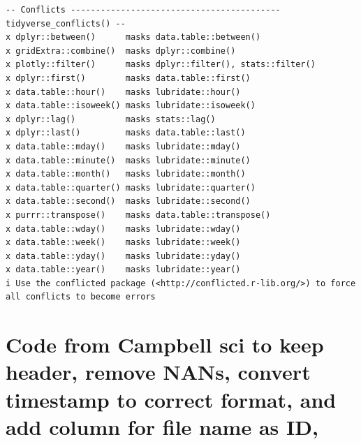\documentclass[
  letterpaper,
  DIV=11,
  numbers=noendperiod]{scrartcl}
\begin{document}
\begin{verbatim}
-- Conflicts ------------------------------------------ tidyverse_conflicts() --
x dplyr::between()      masks data.table::between()
x gridExtra::combine()  masks dplyr::combine()
x plotly::filter()      masks dplyr::filter(), stats::filter()
x dplyr::first()        masks data.table::first()
x data.table::hour()    masks lubridate::hour()
x data.table::isoweek() masks lubridate::isoweek()
x dplyr::lag()          masks stats::lag()
x dplyr::last()         masks data.table::last()
x data.table::mday()    masks lubridate::mday()
x data.table::minute()  masks lubridate::minute()
x data.table::month()   masks lubridate::month()
x data.table::quarter() masks lubridate::quarter()
x data.table::second()  masks lubridate::second()
x purrr::transpose()    masks data.table::transpose()
x data.table::wday()    masks lubridate::wday()
x data.table::week()    masks lubridate::week()
x data.table::yday()    masks lubridate::yday()
x data.table::year()    masks lubridate::year()
i Use the conflicted package (<http://conflicted.r-lib.org/>) to force all conflicts to become errors
\end{verbatim}

\section{Code from Campbell sci to keep header, remove NANs, convert
timestamp to correct format, and add column for file name as
ID,}\label{code-from-campbell-sci-to-keep-header-remove-nans-convert-timestamp-to-correct-format-and-add-column-for-file-name-as-id}
\end{document}
